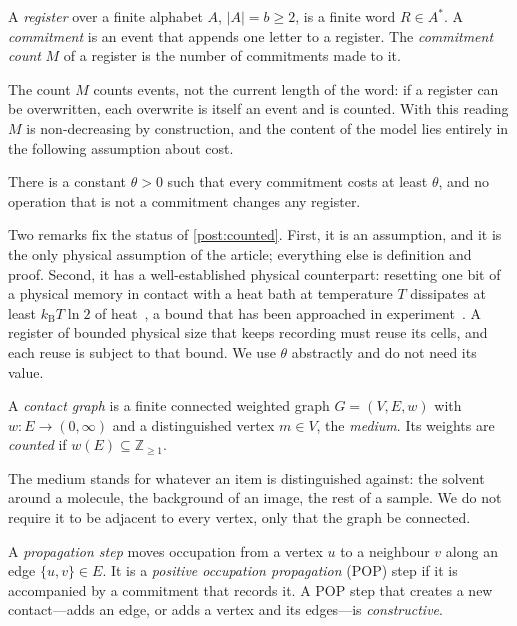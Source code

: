 \documentclass[10pt,twocolumn,a4paper]{article}
\newcommand{\Z}{\mathbb{Z}}
\newcommand{\kB}{k_{\mathrm{B}}}
\newcommand{\med}{m}
\begin{document}
\begin{definition}
\label{def:register}
A \emph{register} over a finite alphabet $A$, $|A|=b\ge2$, is a finite word
$R\in A^{*}$. A \emph{commitment} is an event that appends one letter to a
register. The \emph{commitment count} $M$ of a register is the number of
commitments made to it.
\end{definition}

The count $M$ counts events, not the current length of the word: if a
register can be overwritten, each overwrite is itself an event and is
counted. With this reading $M$ is non-decreasing by construction, and the
content of the model lies entirely in the following assumption about cost.

\begin{postulate}
\label{post:counted}
There is a constant $\theta>0$ such that every commitment costs at least
$\theta$, and no operation that is not a commitment changes any register.
\end{postulate}

Two remarks fix the status of \cref{post:counted}. First, it is an
assumption, and it is the only physical assumption of the article; everything
else is definition and proof. Second, it has a well-established physical
counterpart: resetting one bit of a physical memory in contact with a heat
bath at temperature $T$ dissipates at least $\kB T\ln2$ of
heat~\citep{landauer1961,bennett1982}, a bound that has been approached in
experiment~\citep{berut2012}. A register of bounded physical size that keeps
recording must reuse its cells, and each reuse is subject to that bound. We
use $\theta$ abstractly and do not need its value.

\begin{definition}
\label{def:contact}
A \emph{contact graph} is a finite connected weighted graph $G=(V,E,w)$ with
$w:E\to(0,\infty)$ and a distinguished vertex $\med\in V$, the \emph{medium}.
Its weights are \emph{counted} if $w(E)\subseteq\Z_{\ge1}$.
\end{definition}

The medium stands for whatever an item is distinguished against: the solvent
around a molecule, the background of an image, the rest of a sample. We do
not require it to be adjacent to every vertex, only that the graph be
connected.

\begin{definition}
\label{def:pop}
A \emph{propagation step} moves occupation from a vertex $u$ to a neighbour
$v$ along an edge $\{u,v\}\in E$. It is a \emph{positive occupation
propagation} (POP) step if it is accompanied by a commitment that records it.
A POP step that creates a new contact---adds an edge, or adds a vertex and
its edges---is \emph{constructive}.
\end{definition}
\end{document}

